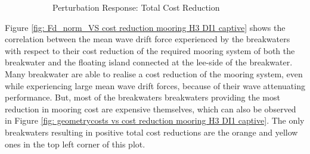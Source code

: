 \begin{figure}[H]
\begin{subfigure}[b]{0.49\textwidth}
        \caption[]%
        {{\small Perturbation Response: Total Cost Reduction}}    
        \label{fig: perturbation R2 costs DI1 H3 captive}
    \end{subfigure}


    \caption{}
    \label{fig: }
\end{figure}

Figure \ref{fig: Fd_norm_VS cost reduction mooring H3 DI1 captive} shows the correlation between the mean wave drift force experienced by the breakwaters with respect to their cost reduction of the required mooring system of both the breakwater and the floating island connected at the lee-side of the breakwater. Many breakwater are able to realise a cost reduction of the mooring system, even while experiencing large mean wave drift forces, because of their wave attenuating performance. But, most of the breakwaters breakwaters providing the most reduction in mooring cost are expensive themselves, which can also be observed in Figure \ref{fig:  geometrycosts vs cost reduction mooring H3 DI1 captive}. The only breakwaters resulting in positive total cost reductions are the orange and yellow ones in the top left corner of this plot. 



